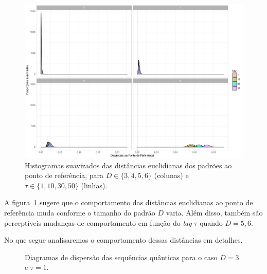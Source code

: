 \begin{figure}[hbt]
\centering
\includegraphics[width=\linewidth]{../Plots/HistoDistanciasQuantTodas}
\caption{Histogramas suavizados das distâncias euclidianas dos padrões ao ponto de referência, para $D\in\{3,4,5,6\}$ (colunas) e $\tau\in\{1,10,30,50\}$ (linhas).}\label{Fig:HistoDistanciasQuantTodas}
\end{figure}

A figura~\ref{Fig:HistoDistanciasQuantTodas} sugere que o comportamento das distâncias euclidianas ao ponto de referência muda conforme o tamanho do padrão $D$ varia.
Além disso, também são perceptíveis mudanças de comportamento em função do \textit{lag} $\tau$ quando $D=5,6$.

No que segue analisaremos o comportamento dessas distâncias em detalhes.


\begin{figure}
\centering
{}
\caption{Diagramas de dispersão das sequências quânticas para o caso $D=3$ e $\tau=1$.}\label{Fig:QuantD3tau1}
\end{figure}


